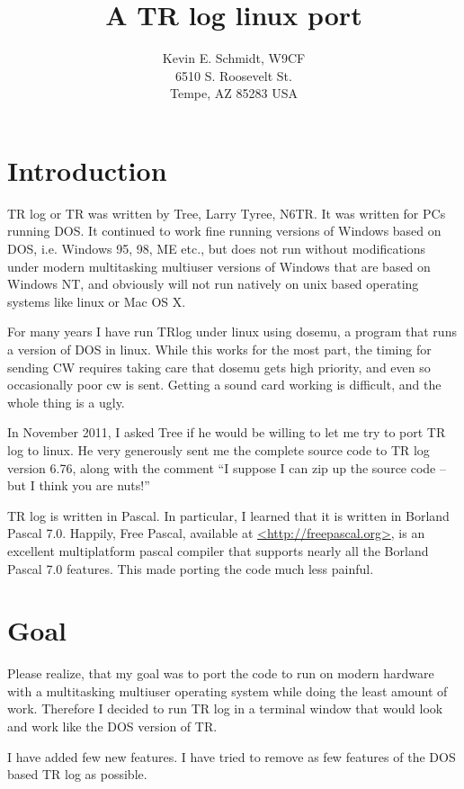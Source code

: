 \documentclass[12pt]{article}
\begin{document}
\title{A TR log linux port}
\author{
Kevin E. Schmidt, W9CF\\
6510 S. Roosevelt St.\\
Tempe, AZ 85283 USA\\
}
\date{}
\maketitle
\section{Introduction}
TR log or TR was written by Tree, Larry Tyree, N6TR. It was written for PCs
running DOS. It continued to work fine running versions of Windows based
on DOS, i.e. Windows 95, 98, ME etc., but does not run without
modifications under modern
multitasking multiuser versions of Windows that are based on Windows NT,
and obviously will not run natively on unix based operating systems like
linux or Mac OS X.

For many years I have run TRlog under linux using dosemu, a program that
runs a version of DOS in linux. While this works for the most part,
the timing for sending CW requires taking care that dosemu gets high
priority, and even so occasionally poor cw is sent. Getting a sound card
working is difficult, and the whole thing is a ugly.

In November 2011, I asked Tree if he would be willing to let me try to
port TR log to linux. He very generously sent me the complete source
code to TR log version 6.76, along with the comment ``I suppose I can
zip up the source code -- but I think you are nuts!''

TR log is written in Pascal. In particular, I learned that it
is written in Borland Pascal 7.0. Happily, Free Pascal, available at
\url{<http://freepascal.org>},
is an excellent multiplatform pascal compiler that supports
nearly all the Borland Pascal 7.0 features. This made porting
the code much less painful.

\section{Goal}

Please realize, that my goal was to port the code to run on modern
hardware with a multitasking multiuser operating system while doing
the least
amount of work. Therefore I decided to run TR log in a terminal window
that would look and work like the DOS version of TR.

I have
added few new
features. I have tried to remove as few features of the DOS based
TR log as possible. 
\end{document}
